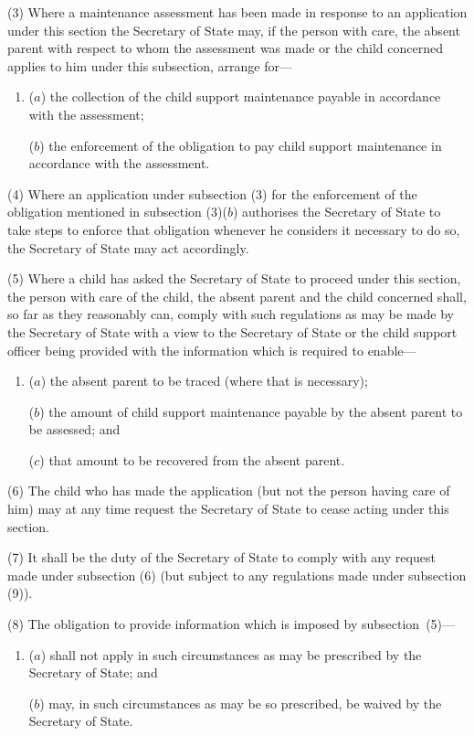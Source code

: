 \documentclass[12pt,a4paper]{article}
\begin{document}
(3) Where a maintenance assessment has been made in response to an application under this section the Secretary of State may, if the person with care, the absent parent with respect to whom the assessment was made or the child concerned applies to him under this subsection, arrange for—
\begin{enumerate}\item[]
($a$) the collection of the child support maintenance payable in accordance with the assessment;

($b$) the enforcement of the obligation to pay child support maintenance in accordance with the assessment.
\end{enumerate}

(4) Where an application under subsection (3)  for the enforcement of the obligation mentioned in subsection (3)($b$)  authorises the Secretary of State to take steps to enforce that obligation whenever he considers it necessary to do so, the Secretary of State may act accordingly.

(5) Where a child has asked the Secretary of State to proceed under this section, the person with care of the child, the absent parent and the child concerned shall, so far as they reasonably can, comply with such regulations as may be made by the Secretary of State with a view to the Secretary of State or the child support officer being provided with the information which is required to enable—
\begin{enumerate}\item[]
($a$) the absent parent to be traced (where that is necessary);

($b$) the amount of child support maintenance payable by the absent parent to be assessed; and

($c$) that amount to be recovered from the absent parent.
\end{enumerate}

(6) The child who has made the application (but not the person having care of him) may at any time request the Secretary of State to cease acting under this section.

(7) It shall be the duty of the Secretary of State to comply with any request made under subsection (6)  (but subject to any regulations made under subsection (9)).

(8) The obligation to provide information which is imposed by subsection~(5)—
\begin{enumerate}\item[]
($a$) shall not apply in such circumstances as may be prescribed by the Secretary of State; and

($b$) may, in such circumstances as may be so prescribed, be waived by the Secretary of State.
\end{enumerate}
\end{document}
